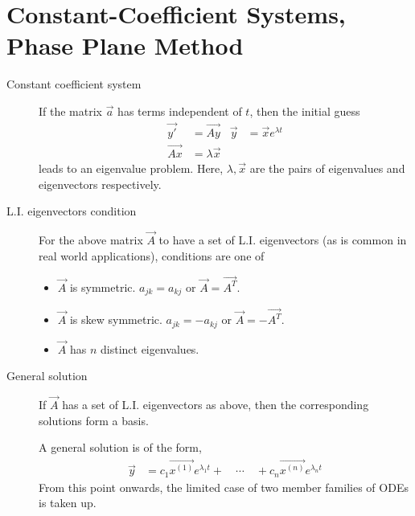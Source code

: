 \section{Constant-Coefficient Systems, Phase Plane Method}
\begin{description}
    \item[Constant coefficient system] If the matrix $ \vec{a} $ has terms
        independent of $ t $, then the initial guess
        \begin{align}
            \vec{y'} & = \vec{Ay}        & \vec{y} & = \vec{x} e^{\lambda t} \\
            \vec{Ax} & = \lambda \vec{x}
        \end{align}
        leads to an eigenvalue problem. Here, $ \lambda, \vec{x} $ are the pairs
        of eigenvalues and eigenvectors respectively.
    \item[L.I. eigenvectors condition] For the above matrix $ \vec{A} $ to have
        a set of L.I. eigenvectors (as is common in real world applications), conditions
        are one of
        \begin{itemize}
            \item $\vec{A}$ is symmetric. $ a_{jk} = a_{kj} $ or $\vec{A} = \vec{A^T} $.
            \item $\vec{A}$ is skew symmetric. $ a_{jk} = -a_{kj} $
                  or $\vec{A} = -\vec{A^T} $.
            \item $ \vec{A} $ has $ n $ distinct eigenvalues.
        \end{itemize}
    \item[General solution] If $ \vec{A} $ has a set of L.I. eigenvectors as above,
        then the corresponding solutions form a basis. \par
        A general solution is of the form,
        \begin{align}
            \vec{y} & = c_1 \vec{x^{(1)}}e^{\lambda_1 t} + \quad \cdots \quad
            + c_n \vec{x^{(n)}}e^{\lambda_n t}
        \end{align}
        From this point onwards, the limited case of two member families of
        ODEs is taken up.
\end{description}



